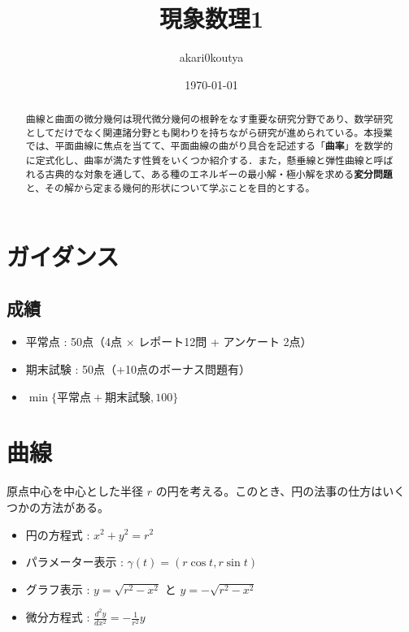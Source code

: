 \documentclass[article,paper=a4paper]{jlreq}
\title{現象数理1}
\author{akari0koutya}
\date{\today}
\begin{document}
\maketitle
\begin{abstract}
    曲線と曲面の微分幾何は現代微分幾何の根幹をなす重要な研究分野であり、数学研究としてだけでなく関連諸分野とも関わりを持ちながら研究が進められている。本授業では、平面曲線に焦点を当てて、平面曲線の曲がり具合を記述する「\textbf{曲率}」を数学的に定式化し、曲率が満たす性質をいくつか紹介する．また，懸垂線と弾性曲線と呼ばれる古典的な対象を通して、ある種のエネルギーの最小解・極小解を求める\textbf{変分問題}と、その解から定まる幾何的形状について学ぶことを目的とする。
\end{abstract}
\tableofcontents

\section{ガイダンス}

\subsection{成績}

\begin{itemize}
    \item 平常点 : 50点（4点 $\times$ レポート12問 + アンケート 2点）
    \item 期末試験 : 50点（+10点のボーナス問題有）
    \item  $\min\{\text{平常点}+\text{期末試験},100\}$
\end{itemize}

\section{曲線}

原点中心を中心とした半径 $r$ の円を考える。このとき、円の法事の仕方はいくつかの方法がある。
\begin{itemize}
    \item 円の方程式 : $x^2+y^2=r^2$
    \item パラメーター表示 : $\gamma(t)=(r\cos t, r\sin t)$
    \item グラフ表示 : $y=\sqrt{r^2-x^2}$ と $y=-\sqrt{r^2-x^2}$
    \item 微分方程式 : $\frac{d^2y}{dx^2}=-\frac{1}{r^2}y$
\end{itemize}
\end{document}
